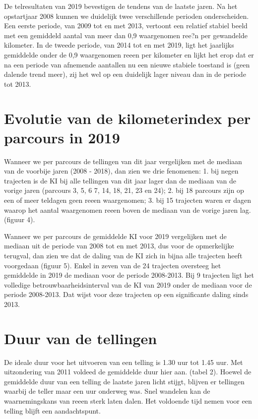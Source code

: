 \documentclass[twoside]{extreport}
\begin{document}
De telresultaten van 2019 bevestigen de tendens van de laatste jaren. Na
het opstartjaar 2008 kunnen we duidelijk twee verschillende perioden
onderscheiden. Een eerste periode, van 2009 tot en met 2013, vertoont
een relatief stabiel beeld met een gemiddeld aantal van meer dan 0,9
waargenomen ree?n per gewandelde kilometer. In de tweede periode, van
2014 tot en met 2019, ligt het jaarlijks gemiddelde onder de 0,9
waargenomen reeen per kilometer en lijkt het erop dat er na een periode
van afnemende aantallen nu een nieuwe stabiele toestand is (geen dalende
trend meer), zij het wel op een duidelijk lager niveau dan in de periode
tot 2013.

\section{Evolutie van de kilometerindex per parcours in
2019}\label{evolutie-van-de-kilometerindex-per-parcours-in-2019}

Wanneer we per parcours de tellingen van dit jaar vergelijken met de
mediaan van de voorbije jaren (2008 - 2018), dan zien we drie fenomenen:
1. bij negen trajecten is de KI bij alle tellingen van dit jaar lager
dan de mediaan van de vorige jaren (parcours 3, 5, 6 7, 14, 18, 21, 23
en 24); 2. bij 18 parcours zijn op een of meer teldagen geen reeen
waargenomen; 3. bij 15 trajecten waren er dagen waarop het aantal
waargenomen reeen boven de mediaan van de vorige jaren lag. (figuur 4).

Wanneer we per parcours de gemiddelde KI voor 2019 vergelijken met de
mediaan uit de periode van 2008 tot en met 2013, dus voor de
opmerkelijke terugval, dan zien we dat de daling van de KI zich in bijna
alle trajecten heeft voorgedaan (figuur 5). Enkel in zeven van de 24
trajecten oversteeg het gemiddelde in 2019 de mediaan voor de periode
2008-2013. Bij 9 trajecten ligt het volledige betrouwbaarheidsinterval
van de KI van 2019 onder de mediaan voor de periode 2008-2013. Dat wijst
voor deze trajecten op een significante daling sinds 2013.

\section{Duur van de tellingen}\label{duur-van-de-tellingen}

De ideale duur voor het uitvoeren van een telling is 1.30 uur tot 1.45
uur. Met uitzondering van 2011 voldeed de gemiddelde duur hier aan.
(tabel 2). Hoewel de gemiddelde duur van een telling de laatste jaren
licht stijgt, blijven er tellingen waarbij de teller maar een uur
onderweg was. Snel wandelen kan de waarnemingskans van reeen sterk laten
dalen. Het voldoende tijd nemen voor een telling blijft een
aandachtspunt.
\end{document}
